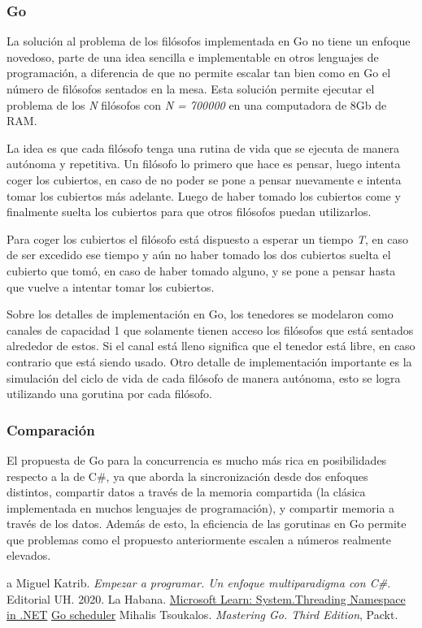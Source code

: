 \documentclass[10pt]{article} %
\begin{document}
\subsubsection{Go}

La solución al problema de los filósofos implementada en Go no tiene un enfoque novedoso, parte de una idea sencilla e implementable en otros lenguajes de programación, a diferencia de que no permite escalar tan bien como en Go el número de filósofos sentados en la mesa. Esta solución permite ejecutar el problema de los \textit{N} filósofos con \textit{N = 700000} en una computadora de 8Gb de RAM.

La idea es que cada filósofo tenga una rutina de vida que se ejecuta de manera autónoma y repetitiva. Un filósofo lo primero que hace es pensar, luego intenta coger los cubiertos, en caso de no poder se pone a pensar nuevamente e intenta tomar los cubiertos más adelante. Luego de haber tomado los cubiertos come y finalmente suelta los cubiertos para que otros filósofos puedan utilizarlos.

Para coger los cubiertos el filósofo está dispuesto a esperar un tiempo \textit{T}, en caso de ser excedido ese tiempo y aún no haber tomado los dos cubiertos suelta el cubierto que tomó, en caso de haber tomado alguno, y se pone a pensar hasta que vuelve a intentar tomar los cubiertos.

Sobre los detalles de implementación en Go, los tenedores se modelaron como canales de capacidad 1 que solamente tienen acceso los filósofos que está sentados alrededor de estos. Si el canal está lleno significa que el tenedor está libre, en caso contrario que está siendo usado. Otro detalle de implementación importante es la simulación del ciclo de vida de cada filósofo de manera autónoma, esto se logra utilizando una gorutina por cada filósofo.

\subsubsection{Comparaci\'on}

El propuesta de Go para la concurrencia es mucho más rica en posibilidades respecto a la de C#, ya que aborda la sincronización desde dos enfoques distintos, compartir datos a través de la memoria compartida (la clásica implementada en muchos lenguajes de programación), y compartir memoria a través de los datos. Además de esto, la eficiencia de las gorutinas en Go permite que problemas como el propuesto anteriormente escalen a números realmente elevados.

\begin{thebibliography}
	a
	 Miguel Katrib. \emph{Empezar a programar. Un enfoque multiparadigma con C\#}. 
	Editorial UH.
	2020.
	La Habana.
	 \href{https://learn.microsoft.com/en-us/dotnet/api/system.threading?view=net-7.0}{Microsoft Learn: System.Threading Namespace in .NET}
         \href{https://morsmachine.dk/go-scheduler}{Go scheduler}
         Mihalis Tsoukalos. \emph{Mastering Go. Third Edition}, Packt.
\end{thebibliography}
\end{document}
